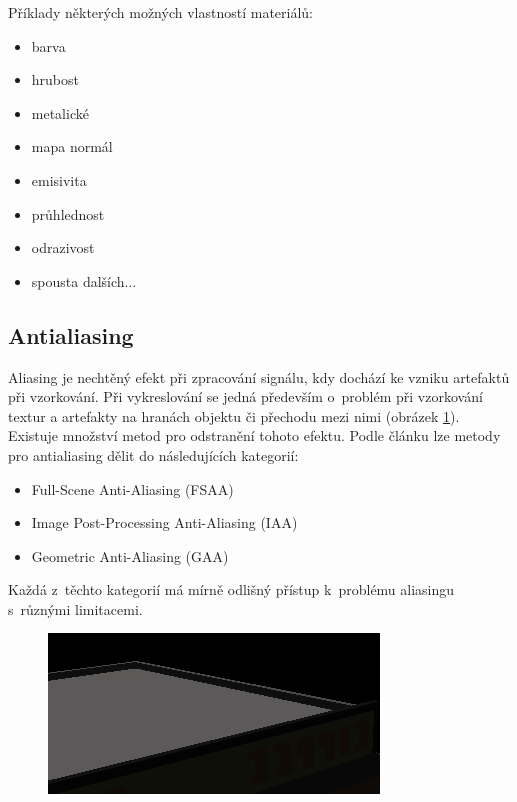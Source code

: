 Příklady některých možných vlastností materiálů:

\begin{itemize}
	\item barva
	\item hrubost
	\item metalické
	\item mapa normál
	\item emisivita
	\item průhlednost
	\item odrazivost
	\item spousta dalších...
\end{itemize}


\subsection{Antialiasing}
Aliasing je nechtěný efekt při zpracování signálu, kdy dochází ke vzniku artefaktů při vzorkování. Při vykreslování se jedná především o~problém při vzorkování textur a artefakty na hranách objektu či přechodu mezi nimi (obrázek \ref{fig:aliasing}). Existuje množství metod pro odstranění tohoto efektu. Podle článku \cite{aa_survey} lze metody pro antialiasing dělit do následujících kategorií:

\begin{itemize}
	\item Full-Scene Anti-Aliasing (FSAA)
	\item Image Post-Processing Anti-Aliasing (IAA)
	\item Geometric Anti-Aliasing (GAA)
\end{itemize}

Každá z~těchto kategorií má mírně odlišný přístup k~problému aliasingu s~různými limitacemi.

\begin{figure}[H]
	\centering
	\includegraphics[scale=2]{obrazky-figures/aliasing.png}
	\captionsetup{justification=centering}
	\label{fig:aliasing}
\end{figure}

